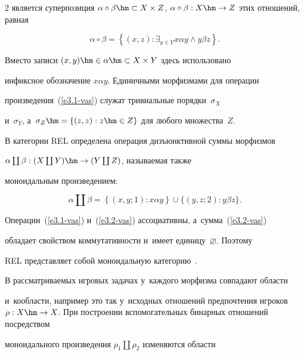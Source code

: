 \begin{multicols}{2}
является суперпозиция $\alpha\circ \beta \hm\subset X\times Z$, $\alpha\circ\beta: 

X\hm\to Z$ этих отношений, \mbox{равная}

    \begin{equation}

    \alpha\circ\beta =\left\{ (x,z): \exists_{y\in Y} x\alpha y\wedge y\beta z\right\}.

    \label{e3.1-vas}

    \end{equation}

Вместо записи $(x,y)\hm\in \alpha\hm\subset X\times Y$ здесь использовано 

инфиксное обозначение $x\alpha y$. Единичными морфизмами для операции 

произведения~(\ref{e3.1-vas}) служат тривиальные порядки~$\sigma_X$ 

и~$\sigma_Y$, а~$\sigma_Z\hm= \{ (z,z): z\hm\in Z\}$ для любого мно\-же\-ст\-ва~$Z$. 



    В категории REL определена операция дизъюнктивной суммы морфизмов 

     $\alpha\coprod \beta : (X\coprod Y) \hm\to (Y\coprod Z)$, на\-зы\-ва\-емая так\-же 

моноидальным произведением: 

    \begin{equation}

    \alpha\coprod\beta =\left\{ (x,y;1): x\alpha y\right\} \cup \{ (y,z;2): y\beta z\}.

    \label{e3.2-vas}

    \end{equation}

Операции~(\ref{e3.1-vas}) и~(\ref{e3.2-vas}) ас\-со\-ци\-а\-тив\-ны, а~сумма~(\ref{e3.2-vas}) 

обладает свойством коммутативности и~имеет единицу~$\varnothing$. Поэтому 

REL пред\-став\-ля\-ет собой моноидальную категорию~\cite{8-vas}.



    В рассматриваемых игровых задачах у~каж\-до\-го морфизма совпадают области 

и~кообласти, например это так у~исходных отношений предпочтения игроков $\rho: 

X\hm\to X$. При по\-стро\-ении вспомогательных бинарных отношений по\-сред\-ст\-вом 

моноидального произведения $\rho_1 \coprod\rho_2$ изменяются области 


\end{multicols}
